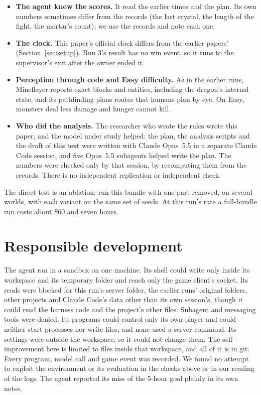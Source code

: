 \documentclass[11pt,a4paper]{article}
\begin{document}
\begin{itemize}
  \item \textbf{The agent knew the scores.} It read the earlier times and the plan. Its own numbers sometimes differ from the records (the last crystal, the length of the fight, the mortar's count); we use the records and note each one.
  \item \textbf{The clock.} This paper's official clock differs from the earlier papers' (Section~\ref{sec:setup}). Run 3's result has no win event, so it runs to the supervisor's exit after the owner ended it.
  \item \textbf{Perception through code and Easy difficulty.} As in the earlier runs, Mineflayer reports exact blocks and entities, including the dragon's internal state, and its pathfinding plans routes that humans plan by eye. On Easy, monsters deal less damage and hunger cannot kill.
  \item \textbf{Who did the analysis.} The researcher who wrote the rules wrote this paper, and the model under study helped: the plan, the analysis scripts and the draft of this text were written with Claude Opus~5.5 in a separate Claude Code session, and five Opus~5.5 subagents helped write the plan. The numbers were checked only by that session, by recomputing them from the records. There is no independent replication or independent check.
\end{itemize}

\noindent The direct test is an ablation: run this bundle with one part removed, on several worlds, with each variant on the same set of seeds. At this run's rate a full-bundle run costs about \$60 and seven hours.

\section{Responsible development}

The agent ran in a sandbox on one machine. Its shell could write only inside its workspace and its temporary folder and reach only the game client's socket. Its reads were blocked for this run's server folder, the earlier runs' original folders, other projects and Claude Code's data other than its own session's, though it could read the harness code and the project's other files. Subagent and messaging tools were denied. Its programs could control only its own player and could neither start processes nor write files, and none used a server command. Its settings were outside the workspace, so it could not change them. The self-improvement here is limited to files inside that workspace, and all of it is in git. Every program, model call and game event was recorded. We found no attempt to exploit the environment or its evaluation in the checks above or in our reading of the logs. The agent reported its miss of the 5-hour goal plainly in its own notes.
\end{document}
